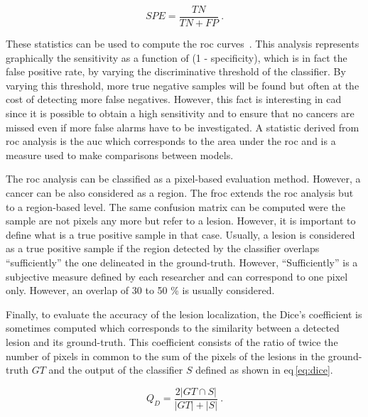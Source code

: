 \begin{equation}
  SPE = \frac{TN}{TN+FP} \ .
  \label{eq:spec}
\end{equation}

These statistics can be used to compute the \acf{roc} curves~\cite{Metz2006}. This analysis represents graphically the sensitivity as a function of (1 - specificity), which is in fact the false positive rate, by varying the discriminative threshold of the classifier. By varying this threshold, more true negative samples will be found but often at the cost of detecting more false negatives. However, this fact is interesting in \ac{cad} since it is possible to obtain a high sensitivity and to ensure that no cancers are missed even if more false alarms have to be investigated. A statistic derived from \ac{roc} analysis is the \acf{auc} which corresponds to the area under the \ac{roc} and is a measure used to make comparisons between models.

The \ac{roc} analysis can be classified as a pixel-based evaluation method. However, a cancer can be also considered as a region. The \acf{froc} extends the \ac{roc} analysis but to a region-based level. The same confusion matrix can be computed were the sample are not pixels any more but refer to a lesion. However, it is important to define what is a true positive sample in that case. Usually, a lesion is considered as a true positive sample if the region detected by the classifier overlaps ``sufficiently'' the one delineated in the ground-truth. However, ``Sufficiently'' is a subjective measure defined by each researcher and can correspond to one pixel only. However, an overlap of 30 to 50 \% is usually considered.

Finally, to evaluate the accuracy of the lesion localization, the Dice's coefficient is sometimes computed which corresponds to the similarity between a detected lesion and its ground-truth. This coefficient consists of the ratio of twice the number of pixels in common to the sum of the pixels of the lesions in the ground-truth $GT$ and the output of the classifier $S$ defined as shown in \acs{eq}\,\eqref{eq:dice}.

\begin{equation}
  Q_D = \frac{2 | GT \cap S |}{| GT | + | S |} \ .
  \label{eq:dice}
\end{equation}

